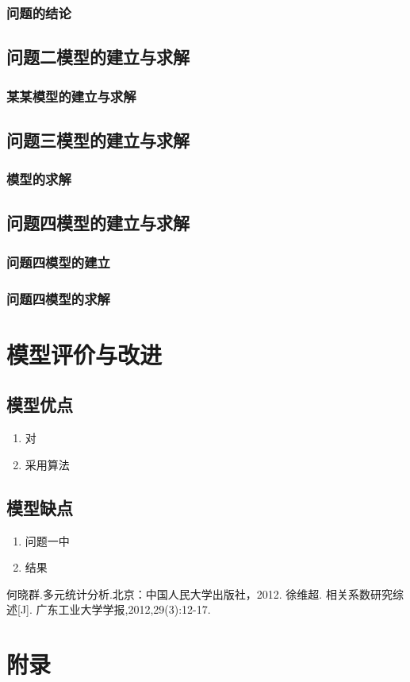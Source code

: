 \documentclass{ctexart}
\begin{document}
    \subsubsection{问题的结论}
    \subsection{问题二模型的建立与求解}
    
    \subsubsection{某某模型的建立与求解}
    \subsection{问题三模型的建立与求解}
    \subsubsection{模型的求解}
    
    \subsection{问题四模型的建立与求解}
    \subsubsection{问题四模型的建立}
    \subsubsection{问题四模型的求解}
            
    \section{模型评价与改进}
    \subsection{模型优点}
    \begin{enumerate}[(1)]
        \item 对
        \item 采用算法
    \end{enumerate}
    \subsection{模型缺点}
    \begin{enumerate}[(1)]
        \item 问题一中
        \item 结果
    \end{enumerate}

    \begin{thebibliography}{9} %
		何晓群.多元统计分析.北京：中国人民大学出版社，2012.
		徐维超. 相关系数研究综述[J]. 广东工业大学学报,2012,29(3):12-17.
    \end{thebibliography}
    
    \newpage
    \section{附录}
    \begin{lstlisting}
    \end{lstlisting}
\end{document}

